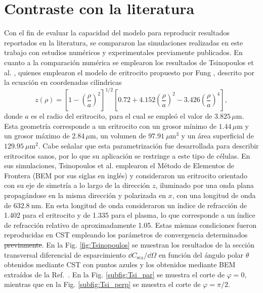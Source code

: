 
\section{Contraste con la literatura}
\label{section:Res_Esferocito}

Con el fin de evaluar la capacidad del modelo para reproducir resultados reportados en la literatura, se compararon las simulaciones realizadas en este trabajo con estudios numéricos y experimentales previamente publicados. En cuanto a la comparación numérica se emplearon los resultados de Tsinopoulos et al. \cite{tsinopoulosLightScatteringAggregated2002}, quienes emplearon el modelo de eritrocito propuesto por Fung \cite{fungBiomechanicsMechanicalProperties1990}, descrito por la ecuación en coordenadas cilíndricas
%
\begin{equation}
	z(\rho)=\left[1-\left(\dfrac{\rho}{a}\right)^2\right]^{1/2}\left[0.72+4.152\left(\dfrac{\rho}{a}\right)^2-3.426\left(\dfrac{\rho}{a}\right)^4\right],
	\label{eq:Tsang_eri}
\end{equation}
%
donde $a$ es el radio del eritrocito, para el cual se empleó el valor de $3.825\,\mu$m. Esta geometría corresponde a un eritrocito con un grosor mínimo de $1.44\,\mu$m y un grosor máximo de $2.84\,\mu$m, un volumen de $97.91~\mu\text{m}^3$ y un área superficial de $129.95~\mu\text{m}^2$. %
%
Cabe señalar que esta parametrización fue desarrollada para describir eritrocitos sanos, por lo que su aplicación se restringe a este tipo de células. En sus simulaciones, Tsinopoulos et al. emplearon el Método de Elementos de Frontera (BEM por sus siglas en inglés)
%
y consideraron un eritrocito orientado con su eje de simetría a lo largo de la dirección $z$, iluminado por una onda plana propagándose en la misma dirección y polarizada en $x$, con una longitud de onda de $632.8~\text{nm}$. En esta longitud de onda consideraron un índice de refracción de 1.402 para el eritrocito y de 1.335 para el plasma, lo que corresponde a un índice de refracción relativo de aproximadamente 1.05. Estas mismas condiciones fueron reproducidas en CST empleando los parámetros de convergencia determinados %
%
\sout{previamente}. En la Fig. \ref{fig:Tsinopoulos} se muestran los resultados de la sección transversal diferencial de esparcimiento $\dd{C_{\text{sca}}/\dd{\Omega}}$ %
%
en función del ángulo polar $\theta$  obtenidos mediante CST con puntos azules y los obtenidos mediante BEM extraídos de la Ref.~\cite{tsinopoulosLightScatteringAggregated2002}. En la Fig. \ref{subfig:Tsi_par} se muestra el corte de $\varphi=0$, mientras que en la Fig. \ref{subfig:Tsi_perp} se muestra el corte de $\varphi=\pi/2$.
%

